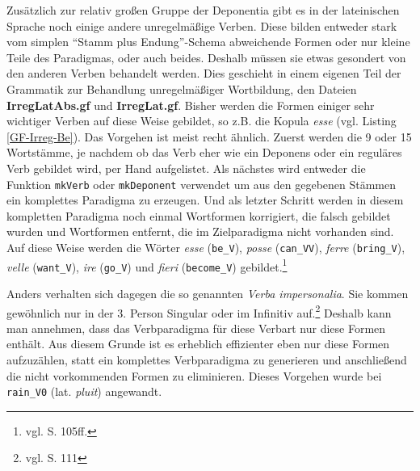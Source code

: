 Zusätzlich zur relativ großen Gruppe der Deponentia gibt es in der lateinischen Sprache noch einige andere unregelmäßige Verben. Diese bilden entweder stark vom simplen ``Stamm plus Endung''-Schema abweichende Formen oder nur kleine Teile des Paradigmas, oder auch beides. Deshalb müssen sie etwas gesondert von den anderen Verben behandelt werden. Dies geschieht in einem eigenen Teil der Grammatik zur Behandlung unregelmäßiger Wortbildung, den Dateien \textbf{IrregLatAbs.gf} und \textbf{IrregLat.gf}. Bisher werden die Formen einiger sehr wichtiger Verben auf diese Weise gebildet, so z.B. die Kopula \textit{esse} (vgl. Listing \ref{GF-Irreg-Be}). Das Vorgehen ist meist recht ähnlich. Zuerst werden die 9 oder 15 Wortstämme, je nachdem ob das Verb eher wie ein Deponens oder ein reguläres Verb gebildet wird, per Hand aufgelistet. Als nächstes wird entweder die Funktion \texttt{mkVerb} oder \texttt{mkDeponent} verwendet um aus den gegebenen Stämmen ein komplettes Paradigma zu erzeugen. Und als letzter Schritt werden in diesem kompletten Paradigma noch einmal Wortformen korrigiert, die falsch gebildet wurden und Wortformen entfernt, die im Zielparadigma nicht vorhanden sind. Auf diese Weise werden die Wörter \textit{esse} (\texttt{be\_V}), \textit{posse} (\texttt{can\_VV}), \textit{ferre} (\texttt{bring\_V}), \textit{velle} (\texttt{want\_V}), \textit{ire} (\texttt{go\_V}) und \textit{fieri} (\texttt{become\_V}) gebildet.\footnote{vgl. \cite{BAYER-LINDAUER1994} S. 105ff.} \par
Anders verhalten sich dagegen die so genannten \textit{Verba impersonalia}. Sie kommen gewöhnlich nur in der 3. Person Singular oder im Infinitiv auf.\footnote{vgl. \cite{BAYER-LINDAUER1994} S. 111} Deshalb kann man annehmen, dass das Verbparadigma für diese Verbart nur diese Formen enthält. Aus diesem Grunde ist es erheblich effizienter eben nur diese Formen aufzuzählen, statt ein komplettes Verbparadigma zu generieren und anschließend die nicht vorkommenden Formen zu eliminieren. Dieses Vorgehen wurde bei \texttt{rain\_V0} (lat. \textit{pluit}) angewandt.
